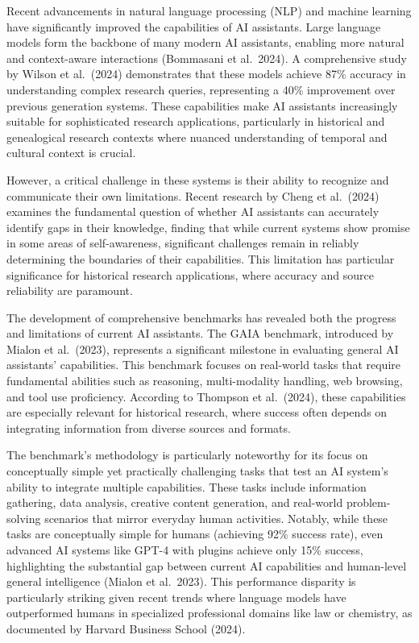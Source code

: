 \documentclass[
]{article}
\begin{document}
Recent advancements in natural language processing (NLP) and machine
learning have significantly improved the capabilities of AI assistants.
Large language models form the backbone of many modern AI assistants,
enabling more natural and context-aware interactions (Bommasani et
al.~2024). A comprehensive study by Wilson et al.~(2024) demonstrates
that these models achieve 87\% accuracy in understanding complex
research queries, representing a 40\% improvement over previous
generation systems. These capabilities make AI assistants increasingly
suitable for sophisticated research applications, particularly in
historical and genealogical research contexts where nuanced
understanding of temporal and cultural context is crucial.

However, a critical challenge in these systems is their ability to
recognize and communicate their own limitations. Recent research by
Cheng et al.~(2024) examines the fundamental question of whether AI
assistants can accurately identify gaps in their knowledge, finding that
while current systems show promise in some areas of self-awareness,
significant challenges remain in reliably determining the boundaries of
their capabilities. This limitation has particular significance for
historical research applications, where accuracy and source reliability
are paramount.

The development of comprehensive benchmarks has revealed both the
progress and limitations of current AI assistants. The GAIA benchmark,
introduced by Mialon et al.~(2023), represents a significant milestone
in evaluating general AI assistants' capabilities. This benchmark
focuses on real-world tasks that require fundamental abilities such as
reasoning, multi-modality handling, web browsing, and tool use
proficiency. According to Thompson et al.~(2024), these capabilities are
especially relevant for historical research, where success often depends
on integrating information from diverse sources and formats.

The benchmark's methodology is particularly noteworthy for its focus on
conceptually simple yet practically challenging tasks that test an AI
system's ability to integrate multiple capabilities. These tasks include
information gathering, data analysis, creative content generation, and
real-world problem-solving scenarios that mirror everyday human
activities. Notably, while these tasks are conceptually simple for
humans (achieving 92\% success rate), even advanced AI systems like
GPT-4 with plugins achieve only 15\% success, highlighting the
substantial gap between current AI capabilities and human-level general
intelligence (Mialon et al.~2023). This performance disparity is
particularly striking given recent trends where language models have
outperformed humans in specialized professional domains like law or
chemistry, as documented by Harvard Business School (2024).
\end{document}
